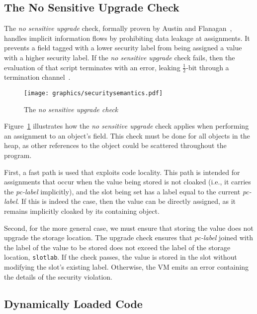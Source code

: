 \documentclass{llncs}
\begin{document}
\subsection{The No Sensitive Upgrade Check}
\label{sec:sensitive-upgrade-check}

The \textit{no sensitive upgrade} check, formally proven by Austin and Flanagan~\cite{1554353}, handles implicit information flows by prohibiting data leakage at assignments.
It prevents a field tagged with a lower security label from being assigned a value with a higher security label.
If the \textit{no sensitive upgrade} check fails, then the evaluation of that script terminates with an error, leaking $\frac{1}{2}$-bit through a termination channel~\cite{1554353}.

\begin{figure}[ht]
   \centerline{\texttt{[image: graphics/securitysemantics.pdf]}}
  \caption{The \textit{no sensitive upgrade check}}
  \label{fig:sensitive-upgrade}
\end{figure}

Figure~\ref{fig:sensitive-upgrade} illustrates how the \textit{no sensitive upgrade} check applies when performing an assignment to an object's field.
This check must be done for all objects in the heap, as other references to the object could be scattered throughout the program.

First, a fast path is used that exploits code locality.
This path is intended for assignments that occur when the value being stored is not cloaked (i.e., it carries the \textit{pc-label} implicitly), and the slot being set has a label equal to the current \textit{pc-label}.
If this is indeed the case, then the value can be directly assigned, as it remains implicitly cloaked by its containing object.

Second, for the more general case, we must ensure that storing the value does not upgrade the storage location.
The upgrade check ensures that \textit{pc-label} joined with the label of the value to be stored does not exceed the label of the storage location, \texttt{slotlab}.
If the check passes, the value is stored in the slot without modifying the slot's existing label.
Otherwise, the VM emits an error containing the details of the security violation.

\subsection{Dynamically Loaded Code}
\end{document}
